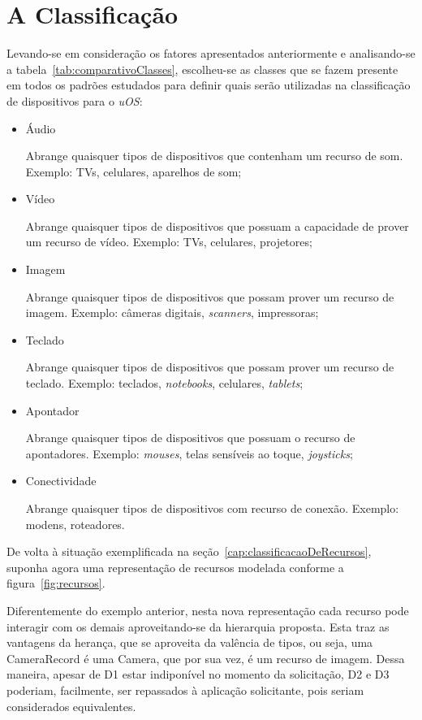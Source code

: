 \section{A Classificação}
Levando-se em consideração os fatores apresentados anteriormente e analisando-se a tabela~\ref{tab:comparativoClasses}, escolheu-se as classes que se fazem presente em todos os padrões estudados para definir quais serão utilizadas na classificação de dispositivos para o \emph{uOS}:

\begin{itemize}
	\item Áudio
		
		Abrange quaisquer tipos de dispositivos que contenham um recurso de som. Exemplo: TVs, celulares, aparelhos de som;
	\item Vídeo
		
		Abrange quaisquer tipos de dispositivos que possuam a capacidade de prover um recurso de vídeo. Exemplo: TVs, celulares, projetores;
	\item Imagem
		
		Abrange quaisquer tipos de dispositivos que possam prover um recurso de imagem. Exemplo: câmeras digitais, \emph{scanners}, impressoras;
	\item Teclado
		
		Abrange quaisquer tipos de dispositivos que possam prover um recurso de teclado. Exemplo: teclados, \emph{notebooks}, celulares, \emph{tablets};
	\item Apontador
		
		Abrange quaisquer tipos de dispositivos que possuam o recurso de apontadores. Exemplo: \emph{mouses}, telas sensíveis ao toque, \emph{joysticks};
	\item Conectividade
		
		Abrange quaisquer tipos de dispositivos com recurso de conexão. Exemplo: modens, roteadores.
\end{itemize}

De volta à situação exemplificada na seção~\ref{cap:classificacaoDeRecursos}, suponha agora uma representação de recursos modelada conforme a figura~\ref{fig:recursos}. 

Diferentemente do exemplo anterior, nesta nova representação cada recurso pode interagir com os demais aproveitando-se da hierarquia proposta. Esta traz as vantagens da herança, que se aproveita da valência de tipos, ou seja, uma CameraRecord é uma Camera, que por sua vez, é um recurso de imagem. Dessa maneira, apesar de D1 estar indiponível no momento da solicitação, D2 e D3 poderiam, facilmente, ser repassados à aplicação solicitante, pois seriam considerados equivalentes.

